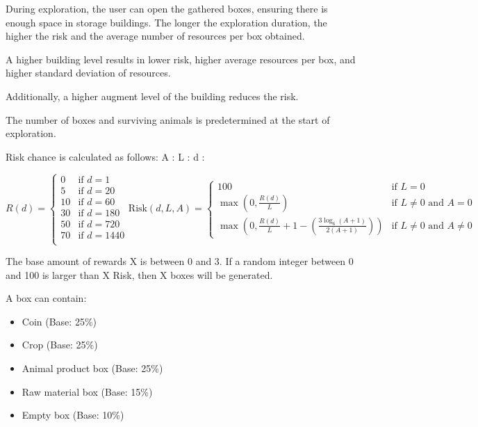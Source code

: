\documentclass[12pt]{article}
\begin{document}
During exploration, the user can open the gathered boxes, ensuring there is enough space in storage buildings. The longer the exploration duration, the higher the risk and the average number of resources per box obtained.

A higher building level results in lower risk, higher average resources per box, and higher standard deviation of resources.

Additionally, a higher augment level of the building reduces the risk.

The number of boxes and surviving animals is predetermined at the start of exploration.

Risk chance is calculated as follows:
A : 
L : 
d : 

\[
R(d) =
\begin{cases}
0 & \text{if } d = 1 \\
5 & \text{if } d = 20 \\
10 & \text{if } d = 60 \\
30 & \text{if } d = 180 \\
50 & \text{if } d = 720 \\
70 & \text{if } d = 1440 \\
\end{cases}

\text{Risk}(d, L, A) =
\begin{cases}
100 & \text{if } L = 0 \\
\max\left(0, \frac{R(d)}{L}\right) & \text{if } L \neq 0 \text{ and } A = 0 \\
\max\left(0, \frac{R(d)}{L} + 1 - \left(\frac{3 \log_6 (A + 1)}{2 (A + 1)}\right)\right) & \text{if } L \neq 0 \text{ and } A \neq 0
\end{cases}
\]

The base amount of rewards X is between 0 and 3. If a random integer between 0 and 100 is larger than X \times Risk, then X boxes will be generated.

A box can contain:

\begin{itemize}
    \item Coin (Base: 25\%)
    \item Crop (Base: 25\%)
    \item Animal product box (Base: 25\%)
    \item Raw material box (Base: 15\%)
    \item Empty box (Base: 10\%)
\end{itemize}
\end{document}
